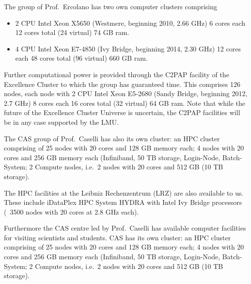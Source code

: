 \documentclass[10pt,fleqn,twoside]{article}
\begin{document}
The group of Prof.\ Ercolano has two own computer clusters comprising 

\begin{itemize}
\item 2 CPU Intel Xeon X5650 (Westmere, beginning
2010, 2.66 GHz) 6 cores each 12 cores total (24 virtual) 74 GB ram.

\item 4 CPU Intel Xeon E7-4850 (Ivy Bridge, beginning 2014, 2.30 GHz)
12 cores each 48 cores total (96 virtual) 660 GB ram.

\end{itemize}

Further computational power is provided through the C2PAP facility of the Excellence Cluster to which
the group has guaranteed time. This comprises 126 nodes, each node with 2 CPU Intel Xeon E5-2680 (Sandy
Bridge, beginning 2012, 2.7 GHz) 8 cores each 16 cores total (32
virtual) 64 GB ram. Note that while the future of the Excellence
Cluster Universe is uncertain, the C2PAP facilities will be in any
case supported by the LMU. 

The CAS group of Prof.\ Caselli has also its own cluster: an HPC
cluster comprising of 25 nodes with 20 cores and 128 GB memory each; 4
nodes with 20 cores and 256 GB memory each (Infiniband, 50 TB storage,
Login-Node, Batch-System; 2 Compute nodes, i.e.\ 2 nodes with 20 cores
and 512 GB (10 TB storage).  

The HPC facilities at the Leibniz Rechenzentrum (LRZ) are also
available to us. These include iDataPlex HPC System HYDRA with Intel
Ivy Bridge processors (~3500 nodes with 20 cores at 2.8 GHz each). 

Furthermore the CAS centre led by Prof.\ Caselli has available computer
facilities for visiting scientists and students. CAS has its own
cluster: an HPC cluster comprising of 25 nodes with 20 cores and 128
GB memory each; 4 nodes with 20 cores and 256 GB memory each
(Infiniband, 50 TB storage, Login-Node, Batch-System; 2 Compute nodes,
i.e.\ 2 nodes with 20 cores and 512 GB (10 TB storage).  


% 
% 
% 
% 
\end{document}
